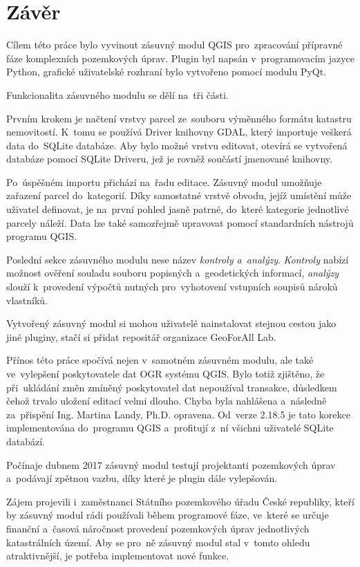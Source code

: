 \chapter{Závěr}
\label{zaver}

Cílem této práce bylo vyvinout zásuvný modul QGIS pro~zpracování přípravné fáze komplexních pozemkových úprav. Plugin byl napsán v~programovacím jazyce Python, grafické uživatelské rozhraní bylo vytvořeno pomocí modulu PyQt.

Funkcionalita zásuvného modulu se dělí na~tři části.

Prvním krokem je načtení vrstvy parcel ze~souboru výměnného formátu katastru nemovitostí. K~tomu se používá  Driver knihovny GDAL, který importuje veš\-kerá data do~SQLite databáze. Aby bylo možné vrstvu editovat, otevírá se vytvořená databáze pomocí SQLite Driveru, jež je rovněž součástí jmenované knihovny.

Po~úspěšném importu přichází na~řadu editace. Zásuvný modul umožňuje zařazení parcel do~kategorií. Díky samostatné vrstvě obvodu, jejíž umístění může uživatel definovat, je na~první pohled jasně patrné, do~které kategorie jednotlivé parcely náleží. Data lze také samozřejmě upravovat pomocí standardních nástrojů programu QGIS.

Poslední sekce zásuvného modulu nese název \textit{kontroly a~analýzy}. \textit{Kontroly} nabízí možnost ověření souladu souboru popisných a~geodetických informací, \textit{analýzy} slouží k~provedení výpočtů nutných pro~vyhotovení vstupních soupisů nároků vlastníků.

Vytvořený zásuvný modul si mohou uživatelé nainstalovat stejnou cestou jako jiné pluginy, stačí si přidat repositář organizace GeoForAll Lab.

Přínos této práce spočívá nejen v~samotném zásuvném modulu, ale také ve~vylep\-šení poskytovatele dat OGR systému QGIS. Bylo totiž zjištěno, že při~ukládání změn zmíněný poskytovatel dat nepoužíval transakce, důsledkem čehož trvalo uložení editací velmi dlouho. Chyba byla nahlášena a~následně za~přispění Ing. Martina Landy, Ph.D. opravena. Od~verze 2.18.5 je tato korekce implementována do~programu QGIS a~profitují z~ní všichni uživatelé SQLite databází.

Počínaje dubnem 2017 zásuvný modul testují projektanti pozemkových úprav a~podávají zpětnou vazbu, díky které je plugin dále vylepšován.

Zájem projevili i~zaměstnanci Státního pozemkového úřadu České republiky, kteří by zásuvný modul rádi používali během programové fáze, ve~které se určuje finanční a~časová náročnost provedení pozemkových úprav jednotlivých katastrálních území. Aby se pro~ně zásuvný modul stal v~tomto ohledu atraktivnější, je potřeba implementovat nové funkce.


